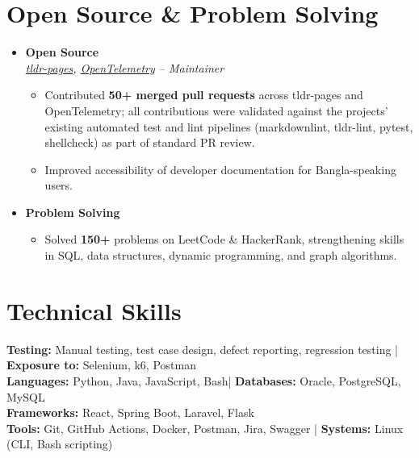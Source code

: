 \documentclass[a4paper]{article}
\newcommand{\resumeItem}[1]{
  \item\small{
    {#1 \vspace{-2pt}}
  }
}
\newcommand{\resumeItemListStart}{\begin{itemize}}
\newcommand{\resumeItemListEnd}{\end{itemize}\vspace{-5pt}}
\begin{document}
\section{Open Source \& Problem Solving}
  \begin{itemize}[leftmargin=0.15in, label={}, itemsep=6pt]

    \item
    \textbf{Open Source} \\
    \small\textit{\href{https://github.com/tldr-pages/tldr}{tldr-pages}, \href{https://github.com/open-telemetry}{OpenTelemetry} -- Maintainer}
    \vspace{-5pt}
    \resumeItemListStart
      \resumeItem{Contributed \textbf{50+ merged pull requests} across tldr-pages and OpenTelemetry; all contributions were validated against the projects' existing automated test and lint pipelines (markdownlint, tldr-lint, pytest, shellcheck) as part of standard PR review.}
      \resumeItem{Improved accessibility of developer documentation for Bangla-speaking users.}
    \resumeItemListEnd

    \item
    \textbf{Problem Solving}
    \vspace{-5pt}
    \resumeItemListStart
      \resumeItem{Solved \textbf{150+} problems on LeetCode \& HackerRank, strengthening skills in SQL, data structures, dynamic programming, and graph algorithms.}
    \resumeItemListEnd

  \end{itemize}




\section{Technical Skills}
\begin{itemize}[leftmargin=0.15in, label={}]
\small{\item{
\textbf{Testing:} Manual testing, test case design, defect reporting, regression testing \;|\; \textbf{Exposure to:} Selenium, k6, Postman\\
\textbf{Languages:} Python, Java, JavaScript, Bash\;|\;
\textbf{Databases:} Oracle, PostgreSQL, MySQL\\
\textbf{Frameworks:} React, Spring Boot, Laravel, Flask\\
\textbf{Tools:} Git, GitHub Actions, Docker, Postman, Jira, Swagger \;|\;
\textbf{Systems:} Linux (CLI, Bash scripting)
}}
\end{itemize}
\end{document}
